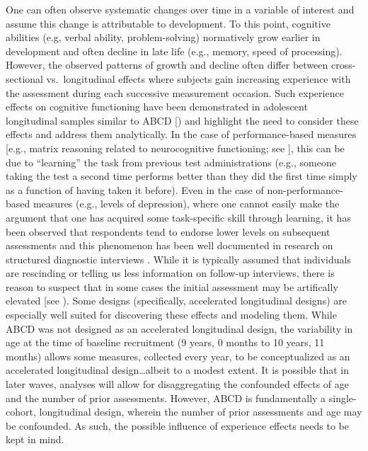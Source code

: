 \documentclass[
  number,
  preprint,
  3p,
  twocolumn]{elsarticle}
\begin{document}
One can often observe systematic changes over time in a variable of
interest and assume this change is attributable to development. To this
point, cognitive abilities (e.g, verbal ability, problem-solving)
normatively grow earlier in development and often decline in late life
(e.g., memory, speed of processing). However, the observed patterns of
growth and decline often differ between cross-sectional vs.~longitudinal
effects \citep{salthouse2014} where subjects gain increasing experience
with the assessment during each successive measurement occasion. Such
experience effects on cognitive functioning have been demonstrated in
adolescent longitudinal samples similar to ABCD {[}\citep{sullivan2017})
and highlight the need to consider these effects and address them
analytically. In the case of performance-based measures {[}e.g., matrix
reasoning related to neurocognitive functioning; see
\citep{salthouse2014}{]}, this can be due to ``learning'' the task from
previous test administrations (e.g., someone taking the test a second
time performs better than they did the first time simply as a function
of having taken it before). Even in the case of non-performance-based
measures (e.g., levels of depression), where one cannot easily make the
argument that one has acquired some task-specific skill through
learning, it has been observed that respondents tend to endorse lower
levels on subsequent assessments \citep[e.g.,][]{beck1961, french2010}
and this phenomenon has been well documented in research on structured
diagnostic interviews \citep{robins1985}. While it is typically assumed
that individuals are rescinding or telling us less information on
follow-up interviews, there is reason to suspect that in some cases the
initial assessment may be artifically elevated {[}see
\citep{shrout2018}). Some designs (specifically, accelerated
longitudinal designs) are especially well suited for discovering these
effects and modeling them. While ABCD was not designed as an accelerated
longitudinal design, the variability in age at the time of baseline
recruitment (9 years, 0 months to 10 years, 11 months) allows some
measures, collected every year, to be conceptualized as an accelerated
longitudinal design\ldots albeit to a modest extent. It is possible that
in later waves, analyses will allow for disaggregating the confounded
effects of age and the number of prior assessments. However, ABCD is
fundamentally a single-cohort, longitudinal design, wherein the number
of prior assessments and age may be confounded. As such, the possible
influence of experience effects needs to be kept in mind.
\end{document}
